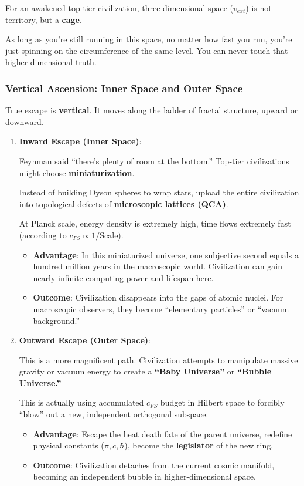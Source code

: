 For an awakened top-tier civilization, three-dimensional space ($v_{ext}$) is not territory, but a \textbf{cage}.

As long as you're still running in this space, no matter how fast you run, you're just spinning on the circumference of the same level. You can never touch that higher-dimensional truth.

\subsubsection{Vertical Ascension: Inner Space and Outer Space}

True escape is \textbf{vertical}. It moves along the ladder of fractal structure, upward or downward.

\begin{enumerate}
\item \textbf{Inward Escape (Inner Space)}:

    Feynman said ``there's plenty of room at the bottom.'' Top-tier civilizations might choose \textbf{miniaturization}.

    Instead of building Dyson spheres to wrap stars, upload the entire civilization into topological defects of \textbf{microscopic lattices (QCA)}.

    At Planck scale, energy density is extremely high, time flows extremely fast (according to $c_{FS} \propto 1/\text{Scale}$).

    \begin{itemize}
    \item \textbf{Advantage}: In this miniaturized universe, one subjective second equals a hundred million years in the macroscopic world. Civilization can gain nearly infinite computing power and lifespan here.

    \item \textbf{Outcome}: Civilization disappears into the gaps of atomic nuclei. For macroscopic observers, they become ``elementary particles'' or ``vacuum background.''
    \end{itemize}

\item \textbf{Outward Escape (Outer Space)}:

    This is a more magnificent path. Civilization attempts to manipulate massive gravity or vacuum energy to create a \textbf{``Baby Universe''} or \textbf{``Bubble Universe.''}

    This is actually using accumulated $c_{FS}$ budget in Hilbert space to forcibly ``blow'' out a new, independent orthogonal subspace.

    \begin{itemize}
    \item \textbf{Advantage}: Escape the heat death fate of the parent universe, redefine physical constants ($\pi, c, \hbar$), become the \textbf{legislator} of the new ring.

    \item \textbf{Outcome}: Civilization detaches from the current cosmic manifold, becoming an independent bubble in higher-dimensional space.
    \end{itemize}
\end{enumerate}

